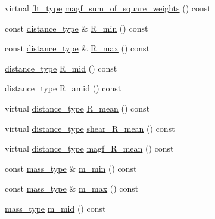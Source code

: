 \begin{DoxyCompactItemize}
\item 
virtual \hyperlink{lib_2IceBRG__main_2common_8h_ad0f130a56eeb944d9ef2692ee881ecc4}{flt\+\_\+type} \hyperlink{classIceBRG_1_1pair__bin__summary_adaabe872405c1f389f340a377725a2c5}{magf\+\_\+sum\+\_\+of\+\_\+square\+\_\+weights} () const 
\item 
const \hyperlink{namespaceIceBRG_a45499647eb87e24c10ab32c628711cec}{distance\+\_\+type} \& \hyperlink{classIceBRG_1_1pair__bin__summary_af1ee4f7eeb70c23843a0ad4af2f41ef9}{R\+\_\+min} () const 
\item 
const \hyperlink{namespaceIceBRG_a45499647eb87e24c10ab32c628711cec}{distance\+\_\+type} \& \hyperlink{classIceBRG_1_1pair__bin__summary_a26bb6d459f592d9ff9f4a11255d5884b}{R\+\_\+max} () const 
\item 
\hyperlink{namespaceIceBRG_a45499647eb87e24c10ab32c628711cec}{distance\+\_\+type} \hyperlink{classIceBRG_1_1pair__bin__summary_a0ba020dcfebf4a714b48315af3b45768}{R\+\_\+mid} () const 
\item 
\hyperlink{namespaceIceBRG_a45499647eb87e24c10ab32c628711cec}{distance\+\_\+type} \hyperlink{classIceBRG_1_1pair__bin__summary_ad265e7f8613d5cccc12279a62521cf53}{R\+\_\+amid} () const 
\item 
virtual \hyperlink{namespaceIceBRG_a45499647eb87e24c10ab32c628711cec}{distance\+\_\+type} \hyperlink{classIceBRG_1_1pair__bin__summary_abe60c51fd11b24f2d92f9b273f291677}{R\+\_\+mean} () const 
\item 
virtual \hyperlink{namespaceIceBRG_a45499647eb87e24c10ab32c628711cec}{distance\+\_\+type} \hyperlink{classIceBRG_1_1pair__bin__summary_ab2eacfc9f48eebb9219aa6f1c573cefe}{shear\+\_\+\+R\+\_\+mean} () const 
\item 
virtual \hyperlink{namespaceIceBRG_a45499647eb87e24c10ab32c628711cec}{distance\+\_\+type} \hyperlink{classIceBRG_1_1pair__bin__summary_a17131edb4b90c3c63f386c9849419963}{magf\+\_\+\+R\+\_\+mean} () const 
\item 
const \hyperlink{namespaceIceBRG_a1be72ac4918a9b029f2eefa084213e35}{mass\+\_\+type} \& \hyperlink{classIceBRG_1_1pair__bin__summary_a3d298870839005a013bbb03a51a9b596}{m\+\_\+min} () const 
\item 
const \hyperlink{namespaceIceBRG_a1be72ac4918a9b029f2eefa084213e35}{mass\+\_\+type} \& \hyperlink{classIceBRG_1_1pair__bin__summary_a385862dcbf0238834d8638a9e79c37fd}{m\+\_\+max} () const 
\item 
\hyperlink{namespaceIceBRG_a1be72ac4918a9b029f2eefa084213e35}{mass\+\_\+type} \hyperlink{classIceBRG_1_1pair__bin__summary_a4e17e3e5675622afcb9882013a539b84}{m\+\_\+mid} () const 

\end{DoxyCompactItemize}
